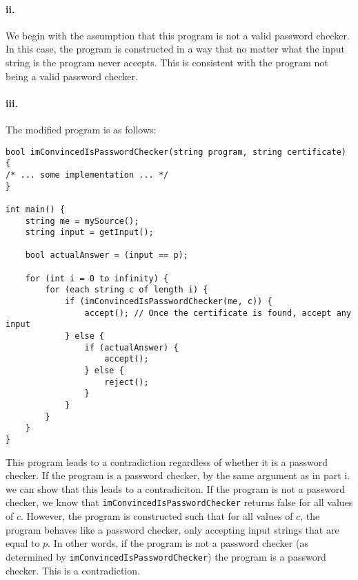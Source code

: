 \documentclass[10pt,letter]{article}
\begin{document}
\paragraph{ii.} We begin with the assumption that this program is not a valid password checker. In this case, the program is constructed in a way that no matter what the input string is the program never accepts. This is consistent with the program not being a valid password checker.

\paragraph{iii.} The modified program is as follows:\\

\begin{lstlisting}
bool imConvincedIsPasswordChecker(string program, string certificate) { 
/* ... some implementation ... */ 
}

int main() {
    string me = mySource();
    string input = getInput();

    bool actualAnswer = (input == p);

    for (int i = 0 to infinity) {
        for (each string c of length i) {
            if (imConvincedIsPasswordChecker(me, c)) {                
                accept(); // Once the certificate is found, accept any input
            } else {
                if (actualAnswer) {
                    accept();
                } else {
                    reject();
                }
            }
        }
    }
}
\end{lstlisting}

This program leads to a contradiction regardless of whether it is a password checker. If the program is a password checker, by the same argument as in part i. we can show that this leads to a contradiciton. If the program is not a password checker, we know that \texttt{imConvincedIsPasswordChecker} returns false for all values of $c$. However, the program is constructed such that for all values of $c$, the program behaves like a password checker, only accepting input strings that are equal to $p$. In other words, if the program is not a password checker (as determined by \texttt{imConvincedIsPasswordChecker}) the program is a password checker. This is a contradiction. 
\end{document}
